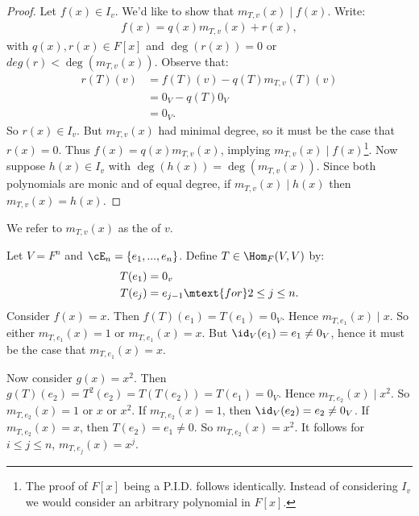 \begin{proof}
            Let $f(x) \in I_v$. We'd like to show that $m_{T,v}(x) \mid f(x)$. Write:
                \begin{equation*}
                \begin{split}
                    f(x) = q(x)m_{T,v}(x) + r(x),
                \end{split}
                \end{equation*}
            with $q(x),r(x) \in F[x]$ and $\deg(r(x)) = 0$ or $deg(r) < \deg(m_{T,v}(x))$. Observe that:
                \begin{equation*}
                \begin{split}
                    r(T)(v) &= f(T)(v) - q(T)m_{T,v}(T)(v) \\
                    & = 0_V - q(T)0_V \\
                    & = 0_V.
                \end{split}
                \end{equation*}
            So $r(x) \in I_v$. But $m_{T,v}(x)$ had minimal degree, so it must be the case that $r(x) = 0$. Thus $f(x) = q(x)m_{T,v}(x)$, implying $m_{T,v}(x) \mid f(x)$\footnote{The proof of $F[x]$ being a P.I.D. follows identically. Instead of considering $I_v$ we would consider an arbitrary polynomial in $F[x]$.}. Now suppose $h(x) \in I_v$ with $\deg(h(x)) = \deg(m_{T,v}(x))$. Since both polynomials are monic and of equal degree, if $m_{T,v}(x) \mid h(x)$ then $m_{T,v}(x) = h(x)$.
        \end{proof}

    \begin{definition}
        We refer to $m_{T,v}(x)$ as the  of $v$.
    \end{definition}

    \begin{example}
        Let $V = F^n$ and $\cE_n = \{e_1,...,e_n\}$. Define $T \in \Hom_F{(V,V)}$ by:
            \begin{equation*}
            \begin{split}
                T(e_1) &= 0_v \\ 
                T(e_j) &= e_{j-1} \mtext{for} 2 \leq j \leq n.
            \end{split}
            \end{equation*}
        Consider $f(x) = x$. Then $f(T)(e_1) = T(e_1) = 0_V$. Hence $m_{T,e_1}(x) \mid x$. So either $m_{T,e_1}(x) = 1$ or $m_{T,e_1}(x) = x$. But $\id_V(e_1) = e_1 \neq 0_V$, hence it must be the case that $m_{T,e_1}(x) = x$.

        Now consider $g(x) = x^2$. Then $g(T)(e_2) = T^2(e_2) = T(T(e_2)) = T(e_1) = 0_V$. Hence $m_{T,e_2}(x) \mid x^2$. So $m_{T,e_2}(x)= 1$ or $x$ or $x^2$. If $m_{T,e_2}(x) = 1$, then $\id_V(e_2) = e_2 \neq 0_V$. If $m_{T,e_2}(x) = x$, then $T(e_2) = e_1 \neq 0$. So $m_{T,e_2}(x) = x^2$. It follows for $i \leq j \leq n$, $m_{T,e_j}(x)=x^j$.
    \end{example}

